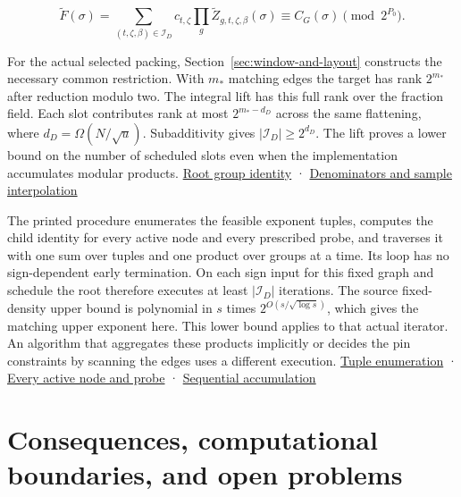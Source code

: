 \documentclass[
  11pt,
]{article}
\begin{document}
\[
 \widetilde F(\sigma)=
 \sum_{(t,\zeta,\beta)\in\mathcal I_D}
 c_{t,\zeta}\prod_g\widetilde Z_{g,t,\zeta,\beta}(\sigma)
 \equiv C_G(\sigma)\pmod{2^{P_0}}.
\]

For the actual selected packing, Section~\ref{sec:window-and-layout} constructs the necessary common restriction. With \(m_*\) matching edges the target has
rank \(2^{m_*}\) after reduction modulo two. The integral lift has this
full rank over the fraction field. Each slot contributes rank at most
\(2^{m_*-d_D}\) across the same flattening, where
\(d_D=\Omega(N/\sqrt u)\). Subadditivity gives
\(|\mathcal I_D|\ge 2^{d_D}\). The lift proves a lower bound on the
number of scheduled slots even when the implementation accumulates
modular products.
\href{https://github.com/openai/math/blob/main/preprints/The-Exponential-Time-Hypothesis-is-False-October-25-2026/build/quantitative-contraction.tex\#L487-L523}{Root
group identity} ·
\href{https://github.com/openai/math/blob/main/preprints/The-Exponential-Time-Hypothesis-is-False-October-25-2026/build/quantitative-contraction.tex\#L275-L345}{Denominators
and sample interpolation}

The printed procedure enumerates the feasible exponent tuples, computes
the child identity for every active node and every prescribed probe, and
traverses it with one sum over tuples and one product over groups at a
time. Its loop has no sign-dependent early termination. On each sign
input for this fixed graph and schedule the root therefore executes at
least \(|\mathcal I_D|\) iterations. The source fixed-density upper
bound is polynomial in \(s\) times \(2^{O(s/\sqrt{\log s})}\), which
gives the matching upper exponent here. This lower bound applies to that
actual iterator. An algorithm that aggregates these products implicitly
or decides the pin constraints by scanning the edges uses a different
execution.
\href{https://github.com/openai/math/blob/main/preprints/The-Exponential-Time-Hypothesis-is-False-October-25-2026/build/quantitative-contraction.tex\#L475-L482}{Tuple
enumeration} ·
\href{https://github.com/openai/math/blob/main/preprints/The-Exponential-Time-Hypothesis-is-False-October-25-2026/build/quantitative-contraction.tex\#L560-L567}{Every
active node and probe} ·
\href{https://github.com/openai/math/blob/main/preprints/The-Exponential-Time-Hypothesis-is-False-October-25-2026/build/quantitative-contraction.tex\#L603-L613}{Sequential
accumulation}

\section{Consequences, computational boundaries, and open
problems}\label{consequences-computational-boundaries-and-open-problems}
\end{document}
